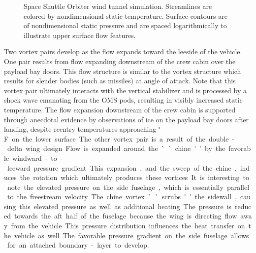 \begin{figure}[hbtp]
\begin{center}
    \caption[Space Shuttle Orbiter wind tunnel simulation]{Space Shuttle Orbiter wind tunnel simulation. Streamlines are colored by nondimensional static temperature.  Surface contours are of nondimensional static pressure and are spaced logarithmically to illustrate upper surface flow features.\label{fig:orbiter_surface_with_streamlines}}
  \end{center}
\end{figure}
Two vortex pairs develop as the flow expands toward the leeside of the vehicle.  One pair results from flow expanding downstream of the crew cabin over the payload bay doors.  This flow structure is similar to the vortex structure which results for slender bodies (such as missiles) at angle of attack.  Note that this vortex pair ultimately interacts with the vertical stabilizer and is processed by a shock wave emanating from the OMS pods, resulting in visibly increased static temperature.  The flow expansion downstream of the crew cabin is supported through anecdotal evidence by observations of ice on the payload bay doors after landing, despite reentry temperatures approaching \unit[3,000]{$^\circ$F} on the lower surface.

The other vortex pair is a result of the double-delta wing design.  Flow is expanded around the ``chine'' by the favorable windward-to-leeward pressure gradient.  This expansion, and the sweep of the chine, induces the rotation which ultimately produces these vortices.  It is interesting to note the elevated pressure on the side fuselage, which is essentially parallel to the freestream velocity.  The chine vortex ``scrubs'' the sidewall, causing this elevated pressure as well as additional heating.  The pressure is reduced towards the aft half of the fuselage because the wing is directing flow away from the vehicle.  This pressure distribution influences the heat transfer on the vehicle as well.  The favorable pressure gradient on the side fuselage allows for an attached boundary-layer to develop.


